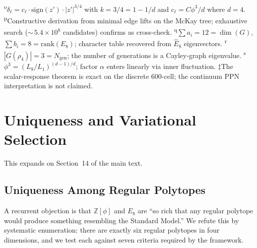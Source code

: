 \documentclass[12pt,a4paper]{article}
\theoremstyle{definition}
\begin{document}
\begin{table}[H]
{\textsuperscript{o}$\delta_\ell = c_\ell \cdot \text{sign}(z') \cdot |z'|^{3/4}$ with $k = 3/4 = 1 - 1/d$ and $c_\ell = C\phi^3/d$ where $d = 4$. \newline
\textsuperscript{p}Constructive derivation from minimal edge lifts on the McKay tree; exhaustive search (${\sim}\,5.4 \times 10^8$ candidates) confirms as cross-check. \newline
\textsuperscript{q}$\sum a_i = 12 = \dim(G)$, $\sum b_i = 8 = \text{rank}(E_8)$; character table recovered from $\hat{E}_8$ eigenvectors. \newline
\textsuperscript{r}$|G(\rho_4)| = 3 = N_{\text{gen}}$; the number of generations is a Cayley-graph eigenvalue. \newline
\textsuperscript{s}$\phi^3 = (L_8/L_1)^{(d-1)/d}$; factor $\alpha$ enters linearly via inner fluctuation. \newline
$\ddagger$The scalar-response theorem is exact on the discrete 600-cell; the continuum PPN interpretation is not claimed.}
\label{tab:S-summary}
\end{table}


\section{Uniqueness and Variational Selection}
\label{sec:S-uniqueness}

This expands on Section~14 of the main text.

\subsection{Uniqueness Among Regular Polytopes}

A recurrent objection is that $\mathbb{Z}[\phi]$ and $E_8$ are ``so rich that any regular polytope would produce something resembling the Standard Model.''  We refute this by systematic enumeration: there are exactly six regular polytopes in four dimensions, and we test each against seven criteria required by the framework.
\end{document}
